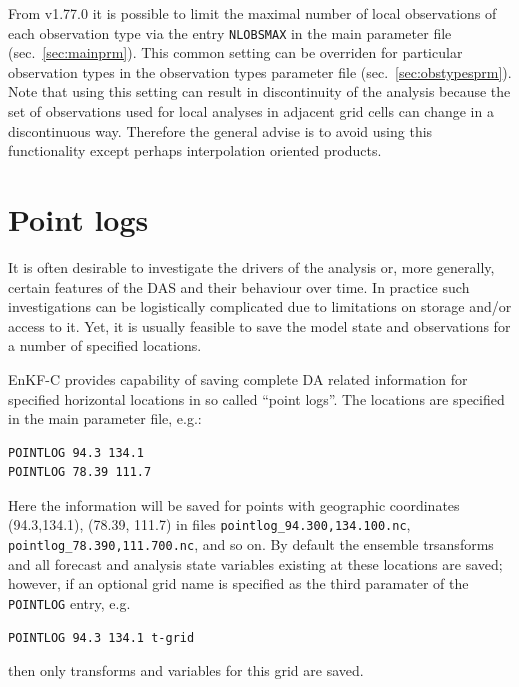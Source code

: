 \documentclass[11pt]{report}
\begin{document}
From v1.77.0 it is possible to limit the maximal number of local observations of each observation type via the entry \verb|NLOBSMAX| in the main parameter file (sec.~\ref{sec:mainprm}).
This common setting can be overriden for particular observation types in the observation types parameter file (sec.~\ref{sec:obstypesprm}).
Note that using this setting can result in discontinuity of the analysis because the set of observations used for local analyses in adjacent grid cells can change in a discontinuous way.
Therefore the general advise is to avoid using this functionality except perhaps interpolation oriented products.

\section{Point logs}
\label{sec:pointlogs}

It is often desirable to investigate the drivers of the analysis or, more generally, certain features of the DAS and their behaviour over time.
In practice such investigations can be logistically complicated due to limitations on storage and/or access to it.
Yet, it is usually feasible to save the model state and observations for a number of specified locations.

EnKF-C provides capability of saving complete DA related information for specified horizontal locations in so called ``point logs''.
The locations are specified in the main parameter file, e.g.:
\begin{Verbatim}
POINTLOG 94.3 134.1
POINTLOG 78.39 111.7
\end{Verbatim}
Here the information will be saved for points with geographic coordinates (94.3,134.1), (78.39, 111.7) in files \verb|pointlog_94.300,134.100.nc|, \verb|pointlog_78.390,111.700.nc|, and so on.
By default the ensemble trsansforms and all forecast and analysis state variables existing at these locations are saved; however, if an optional grid name is specified as the third paramater of the \verb|POINTLOG| entry, e.g.
\begin{Verbatim}
POINTLOG 94.3 134.1 t-grid
\end{Verbatim}
then only transforms and variables for this grid are saved.
\end{document}
